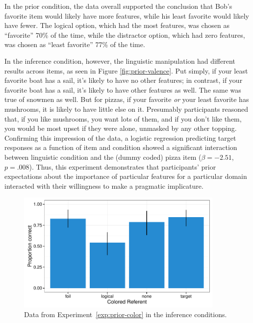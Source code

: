 \documentclass[man]{apa6}
\newcounter{Experiment}
\newcommand{\exptref}[1]{Experiment~\ref{#1}}
\begin{document}
In the prior condition, the data overall supported the conclusion that Bob's favorite item would likely have more features, while his least favorite would likely have fewer. The logical option, which had the most features, was chosen as ``favorite'' 70\% of the time, while the distractor option, which had zero features, was chosen as ``least favorite'' 77\% of the time.

In the inference condition, however, the linguistic manipulation had different results across items, as seen in Figure \ref{fig:prior-valence}. Put simply, if your least favorite boat has a sail, it's likely to have no other features; in contrast, if your favorite boat has a sail, it's likely to have other features as well. The same was true of snowmen as well. But for pizzas, if your favorite \emph{or} your least favorite has mushrooms, it is likely to have little else on it. Presumably participants reasoned that, if you like mushrooms, you want lots of them, and if you don't like them, you would be most upset if they were alone, unmasked by any other topping. Confirming this impression of the data, a logistic regression predicting target responses as a function of item and condition showed a significant interaction between linguistic condition and the (dummy coded) pizza item ($\beta = -2.51$, $p = .008$). Thus, this experiment demonstrates that participants' prior expectations about the importance of particular features for a particular domain interacted with their willingness to make a pragmatic implicature.

\begin{figure}[t]
  \centering
  \includegraphics[width=4in]{../plots/2-prior-color.pdf}
  \caption{\label{fig:prior-color} Data from \exptref{exp:prior-color} in the inference conditions.}
\end{figure}
\end{document}
